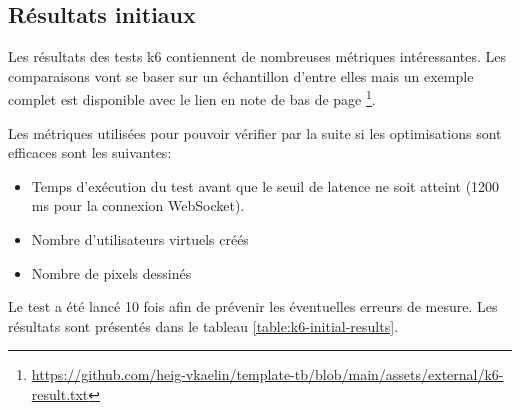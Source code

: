 \subsection{Résultats initiaux}

Les résultats des tests k6 contiennent de nombreuses métriques intéressantes. Les comparaisons vont se baser sur un échantillon d'entre elles mais un exemple complet est disponible avec le lien en note de bas de page \footnote{\url{https://github.com/heig-vkaelin/template-tb/blob/main/assets/external/k6-result.txt}}.

Les métriques utilisées pour pouvoir vérifier par la suite si les optimisations sont efficaces sont les suivantes:

\begin{itemize}
  \item Temps d'exécution du test avant que le seuil de latence ne soit atteint (1200 ms pour la connexion WebSocket).
  \item Nombre d'utilisateurs virtuels créés
  \item Nombre de pixels dessinés
\end{itemize}

Le test a été lancé 10 fois afin de prévenir les éventuelles erreurs de mesure. Les résultats sont présentés dans le tableau \ref{table:k6-initial-results}.


